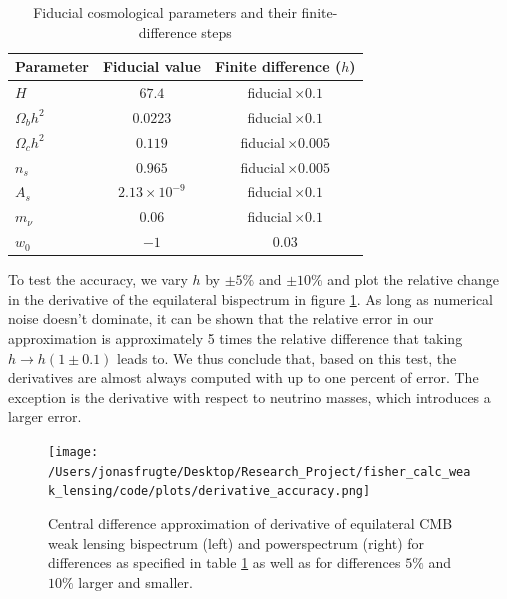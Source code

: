 \documentclass[11pt]{article} %
\begin{document}
\begin{table}[h]
    \centering
    \begin{tabular}{lcc}
    \toprule
    Parameter & Fiducial value & Finite difference ($h$) \\
    \midrule
    $H$            & $67.4$               & fiducial\,$\times0.1$   \\
    $\Omega_b h^2$ & $0.0223$             & fiducial\,$\times0.1$   \\
    $\Omega_c h^2$ & $0.119$              & fiducial\,$\times0.005$ \\
    $n_s$          & $0.965$              & fiducial\,$\times0.005$ \\
    $A_s$          & $2.13\times10^{-9}$  & fiducial\,$\times0.1$   \\
    $m_\nu$        & $0.06$               & fiducial\,$\times0.1$   \\
    $w_0$          & $-1$                 & $0.03$                  \\
    \bottomrule
    \end{tabular}
    \caption{Fiducial cosmological parameters and their finite-difference steps}
    \label{tab:cosmo-params-diff}
\end{table}
    
    

To test the accuracy, we vary $h$ by $\pm 5\%$ and $\pm 10\%$ and plot the relative change in the derivative of the equilateral bispectrum in figure \ref{fig:deraccuracy}. As long as numerical noise doesn't dominate, it can be shown that the relative error in our approximation is approximately 5 times the relative difference that taking $h \rightarrow h(1 \pm 0.1)$ leads to. We thus conclude that, based on this test, the derivatives are almost always computed with up to one percent of error. The exception is the derivative with respect to neutrino masses, which introduces a larger error. 

\begin{figure}[t]
    \centering
    \texttt{[image: /Users/jonasfrugte/Desktop/Research\_Project/fisher\_calc\_weak\_lensing/code/plots/derivative\_accuracy.png]}
    \caption{Central difference approximation of derivative of equilateral CMB weak lensing bispectrum (left) and powerspectrum (right) for differences as specified in table \ref{tab:cosmo-params-diff} as well as for differences $5\%$ and $10\%$ larger and smaller.}
    \label{fig:deraccuracy}
\end{figure}
\end{document}
